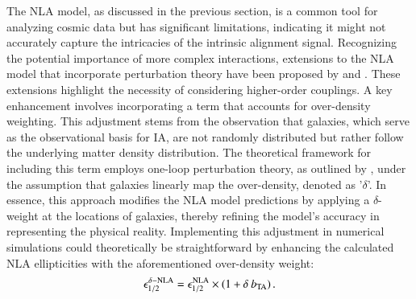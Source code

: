 The NLA model, as discussed in the previous section, is a common tool for analyzing cosmic data but has significant limitations, indicating it might not accurately capture the intricacies of the intrinsic alignment signal. 
Recognizing the potential importance of more complex interactions, extensions to the NLA model that incorporate perturbation theory have been proposed by \citet{Blazek2015} and  \citet{Blazek2019}. 
These extensions highlight the necessity of considering higher-order couplings.
A key enhancement involves incorporating a term that accounts for over-density weighting.
This adjustment stems from the observation that galaxies, which serve as the observational basis for IA, are not randomly distributed but rather follow the underlying matter density distribution. 
The theoretical framework for including this term employs one-loop perturbation theory, as outlined by \citep{Blazek2019}, under the assumption that galaxies linearly map the over-density, denoted as '$\delta$'.
In essence, this approach modifies the NLA model predictions by applying a $\delta$-weight at the locations of galaxies, thereby refining the model's accuracy in representing the physical reality.
Implementing this adjustment in numerical simulations could theoretically be straightforward by enhancing the calculated NLA ellipticities with the aforementioned over-density weight:
\begin{eqnarray}
\epsilon_{1/2}^{\delta-\rm NLA} = \epsilon_{1/2}^{\rm NLA}\times(1 + \delta \: b_{\rm TA}) \, .
\label{eq:tidal_th_deltaNLA}
\end{eqnarray}

